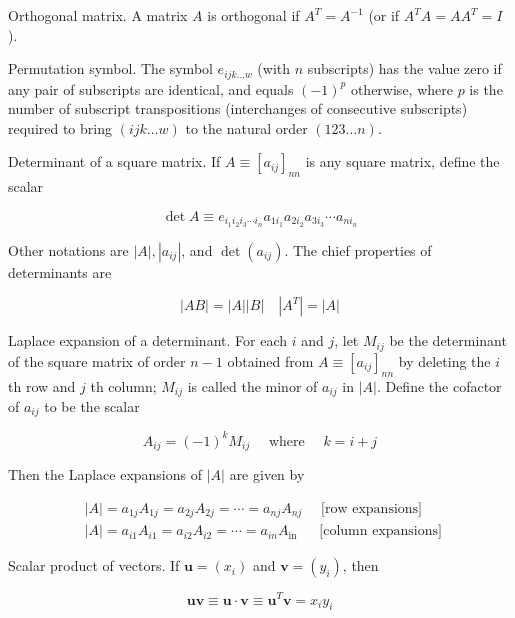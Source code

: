 \documentclass[10pt]{article}
\begin{document}
Orthogonal matrix. A matrix $A$ is orthogonal if $A^{T}=A^{-1}$ (or if $A^{T} A=A A^{T}=I$ ).

Permutation symbol. The symbol $e_{i j k \ldots w}$ (with $n$ subscripts) has the value zero if any pair of subscripts are identical, and equals $(-1)^{p}$ otherwise, where $p$ is the number of subscript transpositions (interchanges of consecutive subscripts) required to bring $(i j k \ldots w)$ to the natural order $(123 \ldots n)$.

Determinant of a square matrix. If $A \equiv\left[a_{i j}\right]_{n n}$ is any square matrix, define the scalar


\begin{equation*}
\operatorname{det} A \equiv e_{i_{1} i_{2} i_{3} \cdots i_{n}} a_{1 i_{1}} a_{2 i_{2}} a_{3 i_{3}} \cdots a_{n i_{n}} \tag{2.3}
\end{equation*}


Other notations are $|A|,\left|a_{i j}\right|$, and $\operatorname{det}\left(a_{i j}\right)$. The chief properties of determinants are


\begin{equation*}
|A B|=|A||B| \quad\left|A^{T}\right|=|A| \tag{2.4}
\end{equation*}


Laplace expansion of a determinant. For each $i$ and $j$, let $M_{i j}$ be the determinant of the square matrix of order $n-1$ obtained from $A \equiv\left[a_{i j}\right]_{n n}$ by deleting the $i$ th row and $j$ th column; $M_{i j}$ is called the minor of $a_{i j}$ in $|A|$. Define the cofactor of $a_{i j}$ to be the scalar


\begin{equation*}
A_{i j}=(-1)^{k} M_{i j} \quad \text { where } \quad k=i+j \tag{2.5}
\end{equation*}


Then the Laplace expansions of $|A|$ are given by

$$
\begin{aligned}
& |A|=a_{1 j} A_{1 j}=a_{2 j} A_{2 j}=\cdots=a_{n j} A_{n j} \quad \text { [row expansions] } \\
& |A|=a_{i 1} A_{i 1}=a_{i 2} A_{i 2}=\cdots=a_{i n} A_{\text {in }} \quad \text { [column expansions] }
\end{aligned}
$$

Scalar product of vectors. If $\mathbf{u}=\left(x_{i}\right)$ and $\mathbf{v}=\left(y_{i}\right)$, then


\begin{equation*}
\mathbf{u v} \equiv \mathbf{u} \cdot \mathbf{v} \equiv \mathbf{u}^{T} \mathbf{v}=x_{i} y_{i} \tag{2.7}
\end{equation*}
\end{document}
